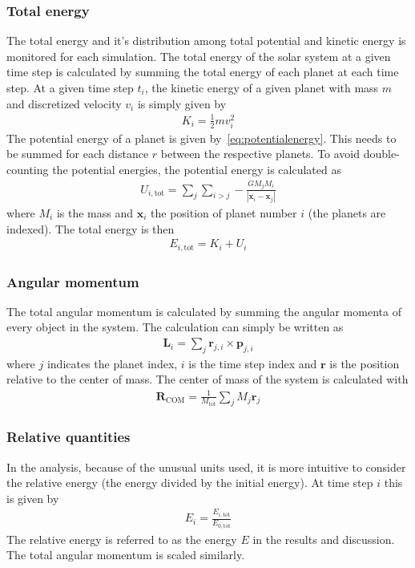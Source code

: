 \documentclass[aps,reprint]{revtex4-1}
\begin{document}
\subsubsection{Total energy}
The total energy and it's distribution among total potential and kinetic energy
is monitored for each simulation. The total energy of the solar system at a given time step is
calculated by summing the total energy of each planet at each time step.
At a given time step $t_i$, the kinetic energy of a given planet with mass $m$
and discretized velocity $v_i$ is simply given by
\begin{align}
  K_i = \frac{1}{2} m v_i^2
\end{align}
The potential energy of a planet is given by~\eqref{eq:potentialenergy}.
This needs to be summed for each distance $r$ between the respective planets. To
avoid double-counting the potential energies, the potential energy is calculated
as
\begin{align}
  U_{i, \text{tot}} = \sum_j \sum_{i > j} - \frac{G M_j M_i}{|\mathbf{x}_i - \mathbf{x}_j|}
\end{align}
where $M_i$ is the mass and $\mathbf{x}_i$ the position of planet number $i$
(the planets are indexed). The total energy is then
\begin{align}
  E_{i,\text{tot}} = K_i + U_i
\end{align}
\subsubsection{Angular momentum}
The total angular momentum is calculated by summing the angular momenta of
every object in the system. The calculation can simply be written as
\begin{align}
  \mathbf{L}_i = \sum_j \mathbf{r}_{j,i} \times \mathbf{p}_{j,i}
\end{align}
where $j$ indicates the planet index, $i$ is the time step index and $\mathbf{r}$ is the
position relative to the center of mass. The center of mass of the system
is calculated with
\begin{align}
  \mathbf{R}_\text{COM} = \frac{1}{M_\text{tot}} \sum_j M_j \mathbf{r}_j
\end{align}
\subsubsection{Relative quantities}
In the analysis, because of the unusual units used, it is more intuitive to
consider the relative energy (the energy divided by the initial energy). At time step $i$
this is given by
\begin{align}
  E_i = \frac{E_{i,\text{tot}}}{E_{0,\text{tot}}}
\end{align}
The relative energy is referred to as the energy $E$ in the results and
discussion. The total angular momentum is scaled similarly.
\end{document}
